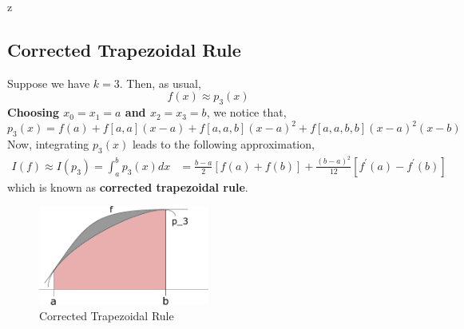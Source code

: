 z\documentclass[a4paper,12pt,twoside]{book}
\begin{document}
\subsection{Corrected Trapezoidal Rule}
Suppose we have $k=3$. Then, as usual,
\[f(x) \approx p_3(x)\]
\textbf{Choosing $x_0 = x_1 = a$ and $x_2 = x_3 = b$}, we notice that,
\begin{equation*}
    p_3(x) = f(a) + f[a,a](x-a) + f[a,a,b](x-a)^2 + f[a,a,b,b](x-a)^2(x-b)
    \end{equation*}
Now, integrating $p_3(x)$ leads to the following approximation,
\begin{equation}
    \begin{split}
        I(f) \approx I(p_3) = \int_a^bp_3(x) dx &= \frac{b-a}{2}[f(a) + f(b)] + \frac{(b-a)^2}{12}[f^\prime(a) - f^\prime(b)]
    \end{split}
\end{equation}
which is known as \textbf{corrected trapezoidal rule}.  
\begin{figure}[h!]
    \centering
    \includegraphics[width = 0.5\textwidth]{CorrectedTrapezoidalRule.pdf}
    \caption{Corrected Trapezoidal Rule}
    \label{fig:5}
\end{figure}
\end{document}
